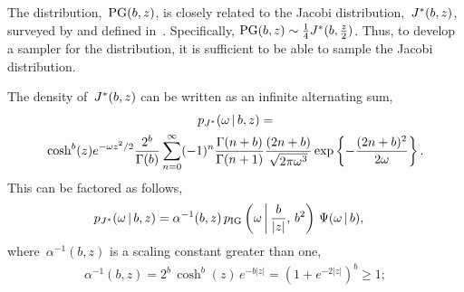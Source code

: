 The \polyagamma distribution,~$\mathrm{PG}(b,z)$, is closely related 
to the Jacobi distribution,~$J^{*}(b,z)$, surveyed by \citet{biane2001probability} and 
defined in~\citet{windle2014sampling}.
Specifically, ${\mathrm{PG}(b, z) \sim \frac{1}{4} J^{*}(b, \tfrac{z}{2})}$.
Thus, to develop a sampler for the \polyagamma distribution, 
it is sufficient to be able to sample the Jacobi distribution.

The density of~$J^{*}(b,z)$ can be written as an infinite alternating sum,
\begin{multline*}
  p_{J^{*}}({\omega} \,|\, b, z) = \\ 
  \cosh^b(z) e^{-{\omega} z^2/2} \frac{2^b}{\Gamma(b)} 
  \sum_{n=0}^\infty (-1)^n \frac{\Gamma(n+b)}{\Gamma(n+1)} \frac{(2n+b)}{\sqrt{2\pi {\omega}^3}}
  \exp\left\{- \frac{(2n+b)^2}{2{\omega}} \right\}.
\end{multline*}
This can be factored as follows,
\begin{align*}
  p_{J^{*}}({\omega} \,|\, b,z) &= 
   \alpha^{-1}(b,z) \,
   p_{\mathrm{IG}}\left({\omega} \, \bigg| \, \frac{b}{|z|}, \, b^2 \right) \,
   \Psi({\omega} \,|\, b),
\end{align*}
where~$\alpha^{-1}(b,z)$ is a scaling constant greater than one,
\begin{align*}
  \alpha^{-1}(b,z) = 2^b \, \cosh^b(z) \, e^{-b|z|} 
  = \left(1 + e^{-2|z|} \right)^b \geq 1;
\end{align*}
